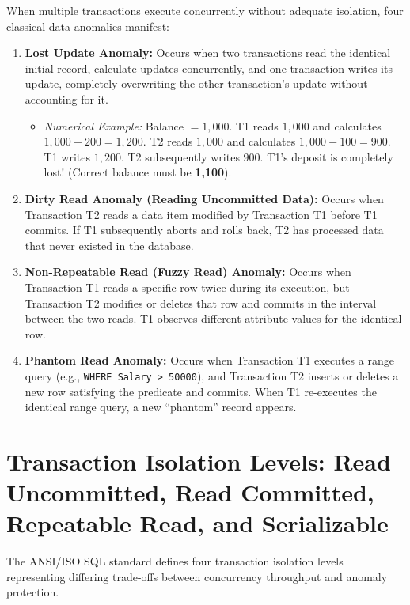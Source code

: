 When multiple transactions execute concurrently without adequate isolation, four classical data anomalies manifest:

\begin{enumerate}
\item \textbf{Lost Update Anomaly:}
Occurs when two transactions read the identical initial record, calculate updates concurrently, and one transaction writes its update, completely overwriting the other transaction's update without accounting for it.
\begin{itemize}
\item \textit{Numerical Example:} Balance $= 1,000$. T1 reads $1,000$ and calculates $1,000 + 200 = 1,200$. T2 reads $1,000$ and calculates $1,000 - 100 = 900$. T1 writes $1,200$. T2 subsequently writes $900$. T1's deposit is completely lost! (Correct balance must be \textbf{1,100}).
\end{itemize}

\item \textbf{Dirty Read Anomaly (Reading Uncommitted Data):}
Occurs when Transaction T2 reads a data item modified by Transaction T1 before T1 commits. If T1 subsequently aborts and rolls back, T2 has processed data that never existed in the database.

\item \textbf{Non-Repeatable Read (Fuzzy Read) Anomaly:}
Occurs when Transaction T1 reads a specific row twice during its execution, but Transaction T2 modifies or deletes that row and commits in the interval between the two reads. T1 observes different attribute values for the identical row.

\item \textbf{Phantom Read Anomaly:}
Occurs when Transaction T1 executes a range query (e.g., \texttt{WHERE Salary > 50000}), and Transaction T2 inserts or deletes a new row satisfying the predicate and commits. When T1 re-executes the identical range query, a new ``phantom'' record appears.
\end{enumerate}

\newpage
\section{Transaction Isolation Levels: Read Uncommitted, Read Committed, Repeatable Read, and Serializable}

The ANSI/ISO SQL standard defines four transaction isolation levels representing differing trade-offs between concurrency throughput and anomaly protection.

